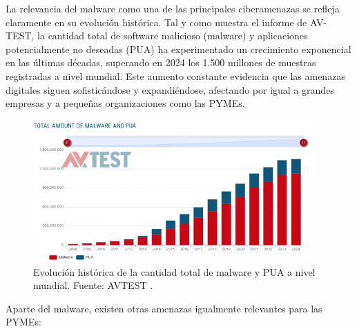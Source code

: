 \documentclass[a4paper, 10pt]{article}
\begin{document}
\vspace{0.5cm}

La relevancia del malware como una de las principales ciberamenazas se refleja claramente en su evolución histórica. Tal y como muestra el informe de AV-TEST, la cantidad total de software malicioso (malware) y aplicaciones potencialmente no deseadas (PUA) ha experimentado un crecimiento exponencial en las últimas décadas, superando en 2024 los 1.500 millones de muestras registradas a nivel mundial. Este aumento constante evidencia que las amenazas digitales siguen sofisticándose y expandiéndose, afectando por igual a grandes empresas y a pequeñas organizaciones como las PYMEs.

\vspace{0.3cm}

\begin{figure}[H]
    \centering
    \includegraphics[width=0.95\textwidth]{images/malware.png}
    \caption{Evolución histórica de la cantidad total de malware y PUA a nivel mundial. Fuente: AVTEST \cite{avtest}.}
\end{figure}

\vspace{0.5cm}

Aparte del malware, existen otras amenazas igualmente relevantes para las PYMEs: 
\end{document}
